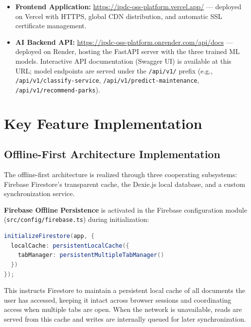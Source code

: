 \begin{itemize}

  \item \textbf{Frontend Application:} \url{https://ipdc-oss-platform.vercel.app/} --- deployed on Vercel with HTTPS, global CDN distribution, and automatic SSL certificate management.

  \item \textbf{AI Backend API:} \url{https://ipdc-oss-platform.onrender.com/api/docs} --- deployed on Render, hosting the FastAPI server with the three trained ML models. Interactive API documentation (Swagger UI) is available at this URL; model endpoints are served under the \texttt{/api/v1/} prefix (e.g., \texttt{/api/v1/classify-service}, \texttt{/api/v1/predict-maintenance}, \texttt{/api/v1/recommend-parks}).

\end{itemize}

\section{Key Feature Implementation}

\subsection{Offline-First Architecture Implementation}

The offline-first architecture is realized through three cooperating subsystems: Firebase Firestore's transparent cache, the Dexie.js local database, and a custom synchronization service.

\textbf{Firebase Offline Persistence} is activated in the Firebase configuration module (\texttt{src/config/firebase.ts}) during initialization:

\begin{lstlisting}[language=Java, caption={Firebase Offline Persistence Configuration}, label={lst:firebase-config}]
initializeFirestore(app, {
  localCache: persistentLocalCache({
    tabManager: persistentMultipleTabManager()
  })
});
\end{lstlisting}

This instructs Firestore to maintain a persistent local cache of all documents the user has accessed, keeping it intact across browser sessions and coordinating access when multiple tabs are open. When the network is unavailable, reads are served from this cache and writes are internally queued for later synchronization.

